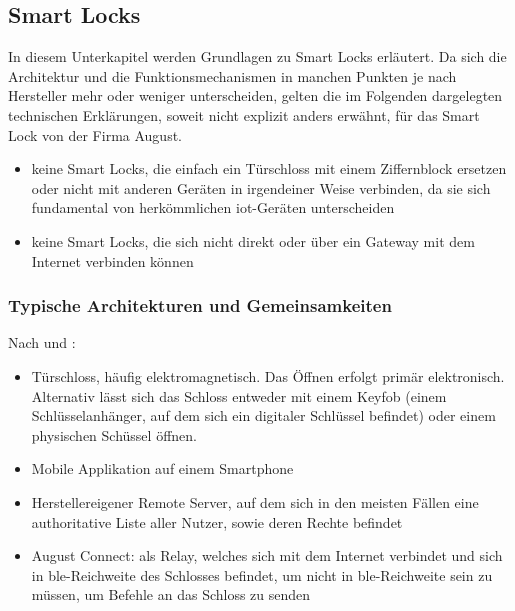 \subsection{Smart Locks}
\label{sec:sota_smart_locks}

    In diesem Unterkapitel werden Grundlagen zu Smart Locks erläutert.
    Da sich die Architektur und die Funktionsmechanismen in manchen Punkten je nach Hersteller mehr oder weniger unterscheiden, gelten die im Folgenden dargelegten technischen Erklärungen, soweit nicht explizit anders erwähnt, für das Smart Lock von der Firma August.
	
	\begin{itemize}
	    \item keine Smart Locks, die einfach ein Türschloss mit einem Ziffernblock ersetzen oder nicht mit anderen Geräten in irgendeiner Weise verbinden, da sie sich fundamental von herkömmlichen \gls{iot}-Geräten unterscheiden\cite{Ho2016}
	    \item keine Smart Locks, die sich nicht direkt oder über ein Gateway mit dem Internet verbinden können\cite{Ho2016}
	\end{itemize}
	
	\subsubsection{Typische Architekturen und Gemeinsamkeiten}
	    Nach \citeauthor{Ye2017} und \citeauthor{Fuller2017}:
		\begin{itemize}
			\item Türschloss, häufig elektromagnetisch. Das Öffnen erfolgt primär elektronisch. Alternativ lässt sich das Schloss entweder mit einem Keyfob (einem Schlüsselanhänger, auf dem sich ein digitaler Schlüssel befindet) oder einem physischen Schüssel öffnen.
			\item Mobile Applikation auf einem Smartphone
			\item Herstellereigener Remote Server, auf dem sich in den meisten Fällen eine authoritative Liste aller Nutzer, sowie deren Rechte befindet
			\item August Connect: als Relay, welches sich mit dem Internet verbindet und sich in \gls{ble}-Reichweite des Schlosses befindet, um nicht in \gls{ble}-Reichweite sein zu müssen, um Befehle an das Schloss zu senden
		\end{itemize}

